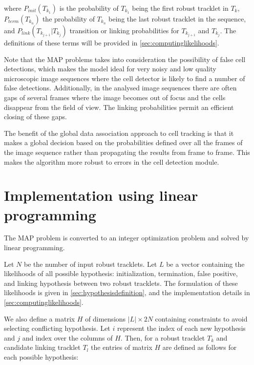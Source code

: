   	 	\noindent where $P_{init}(T_{k_1})$ is the probability of $T_{k_1}$ being the first robust tracklet in $T_k$, $P_{term}(T_{k_n})$ the probability of $T_{k_n}$ being the last robust tracklet in the sequence, and $P_{link}(T_{k_{j+1}}|T_{k_j})$ transition or linking probabilities for $T_{k_{j+1}}$ and $T_{k_{j}}$. The definitions of these terms will be provided in \cref{sec:computinglikelihoods}.
  	 	
  	 	Note that the MAP problems takes into consideration the possibility of false cell detections, which makes the model ideal for very noisy and low quality microscopic image sequences where the cell detector is likely to find a number of false detections. Additionally, in the analysed image sequences there are often gaps of several frames where the image becomes out of focus and the cells disappear from the field of view. The linking probabilities permit an efficient closing of these gaps.
  	 	
  	 	The benefit of the global data association approach to cell tracking is that it makes a global decision based on the probabilities defined over all the frames of the image sequence rather than propagating the results from frame to frame. This makes the algorithm more robust to errors in the cell detection module.
  	 	
	\section{Implementation using linear programming \statusfirstdraft}
		\label{sec:tracking_linearprogramming}
		The MAP problem is converted to an integer optimization problem and solved by linear programming.
		
		Let $N$ be the number of input robust tracklets. Let $L$ be a vector containing the likelihoods of all possible hypothesis: initialization, termination, false positive, and linking hypothesis between two robust tracklets. The formulation of these likelihoods is given in \cref{sec:hypothesisdefinition}, and the implementation details in \cref{sec:computinglikelihoods}.
		
		We also define a matrix $H$ of dimensions $|L| \times 2N$ containing constraints to avoid selecting conflicting hypothesis. Let $i$ represent the index of each new hypothesis and $j$ and index over the columns of $H$. Then, for a robust tracklet $T_k$ and candidate linking tracklet $T_l$ the entries of matrix $H$ are defined as follows for each possible hypothesis:
		
